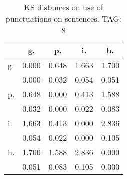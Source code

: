\begin{table}[h!]
\begin{center}
\begin{tabular}{| l | c | c | c | c |}\hline
 & g. & p. & i. & h. \\\hline
g. & 0.000  & 0.648  & 1.663  & 1.700 \\\hline
 & 0.000  & 0.032  & 0.054  & 0.051 \\\hline
p. & 0.648  & 0.000  & 0.413  & 1.588 \\\hline
 & 0.032  & 0.000  & 0.022  & 0.083 \\\hline
i. & 1.663  & 0.413  & 0.000  & 2.836 \\\hline
 & 0.054  & 0.022  & 0.000  & 0.105 \\\hline
h. & 1.700  & 1.588  & 2.836  & 0.000 \\\hline
 & 0.051  & 0.083  & 0.105  & 0.000 \\\hline
\end{tabular}
\caption{KS distances on use of punctuations on sentences. TAG: 8}
\end{center}
\end{table}